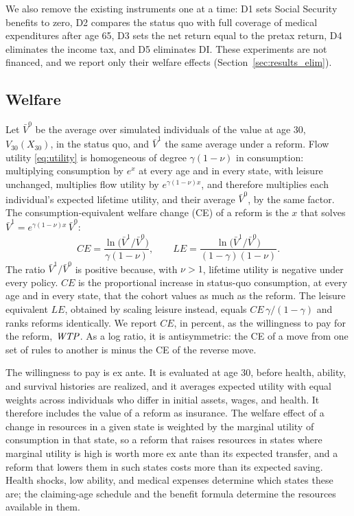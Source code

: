 We also remove the existing instruments one at a time: D1 sets Social Security benefits to zero, D2 compares the status quo with full coverage of medical expenditures after age 65, D3 sets the net return equal to the pretax return, D4 eliminates the income tax, and D5 eliminates DI. These experiments are not financed, and we report only their welfare effects (Section~\ref{sec:results_elim}).

\subsection{Welfare}\label{sec:fw_welfare}

Let $\bar V^{0}$ be the average over simulated individuals of the value at age 30, $V_{30}(X_{30})$, in the status quo, and $\bar V^{1}$ the same average under a reform. Flow utility \eqref{eq:utility} is homogeneous of degree $\gamma(1-\nu)$ in consumption: multiplying consumption by $e^{x}$ at every age and in every state, with leisure unchanged, multiplies flow utility by $e^{\gamma(1-\nu)x}$, and therefore multiplies each individual's expected lifetime utility, and their average $\bar V^{0}$, by the same factor. The consumption-equivalent welfare change (CE) of a reform is the $x$ that solves $\bar V^{1}=e^{\gamma(1-\nu)x}\,\bar V^{0}$:
\begin{equation}\label{eq:ce}
\mathit{CE}=\frac{\ln\big(\bar V^{1}/\bar V^{0}\big)}{\gamma(1-\nu)},
\qquad
\mathit{LE}=\frac{\ln\big(\bar V^{1}/\bar V^{0}\big)}{(1-\gamma)(1-\nu)}.
\end{equation}
The ratio $\bar V^{1}/\bar V^{0}$ is positive because, with $\nu>1$, lifetime utility is negative under every policy. $\mathit{CE}$ is the proportional increase in status-quo consumption, at every age and in every state, that the cohort values as much as the reform. The leisure equivalent $\mathit{LE}$, obtained by scaling leisure instead, equals $\mathit{CE}\,\gamma/(1-\gamma)$ and ranks reforms identically. We report $\mathit{CE}$, in percent, as the willingness to pay for the reform, $\mathit{WTP}$. As a log ratio, it is antisymmetric: the CE of a move from one set of rules to another is minus the CE of the reverse move.

The willingness to pay is ex ante. It is evaluated at age 30, before health, ability, and survival histories are realized, and it averages expected utility with equal weights across individuals who differ in initial assets, wages, and health. It therefore includes the value of a reform as insurance. The welfare effect of a change in resources in a given state is weighted by the marginal utility of consumption in that state, so a reform that raises resources in states where marginal utility is high is worth more ex ante than its expected transfer, and a reform that lowers them in such states costs more than its expected saving. Health shocks, low ability, and medical expenses determine which states these are; the claiming-age schedule and the benefit formula determine the resources available in them.

